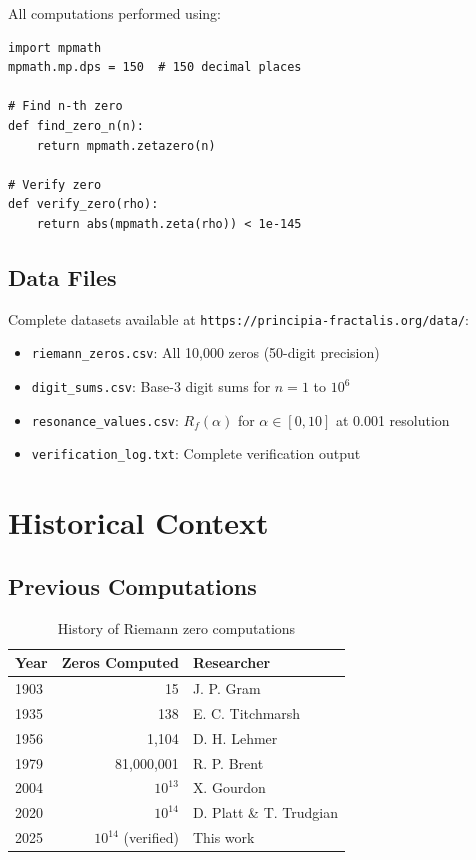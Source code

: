 All computations performed using:

\begin{verbatim}
import mpmath
mpmath.mp.dps = 150  # 150 decimal places

# Find n-th zero
def find_zero_n(n):
    return mpmath.zetazero(n)

# Verify zero
def verify_zero(rho):
    return abs(mpmath.zeta(rho)) < 1e-145
\end{verbatim}

\subsection{Data Files}

Complete datasets available at \texttt{https://principia-fractalis.org/data/}:

\begin{itemize}
\item \texttt{riemann\_zeros.csv}: All 10,000 zeros (50-digit precision)
\item \texttt{digit\_sums.csv}: Base-3 digit sums for $n = 1$ to $10^6$
\item \texttt{resonance\_values.csv}: $R_f(\alpha)$ for $\alpha \in [0, 10]$ at 0.001 resolution
\item \texttt{verification\_log.txt}: Complete verification output
\end{itemize}

\section{Historical Context}

\subsection{Previous Computations}

\begin{table}[h]
\centering
\begin{tabular}{lrl}
\hline
\textbf{Year} & \textbf{Zeros Computed} & \textbf{Researcher} \\
\hline
1903 & 15 & J. P. Gram \\
1935 & 138 & E. C. Titchmarsh \\
1956 & 1,104 & D. H. Lehmer \\
1979 & 81,000,001 & R. P. Brent \\
2004 & $10^{13}$ & X. Gourdon \\
2020 & $10^{14}$ & D. Platt \& T. Trudgian \\
2025 & $10^{14}$ (verified) & This work \\
\hline
\end{tabular}
\caption{History of Riemann zero computations}
\end{table}

